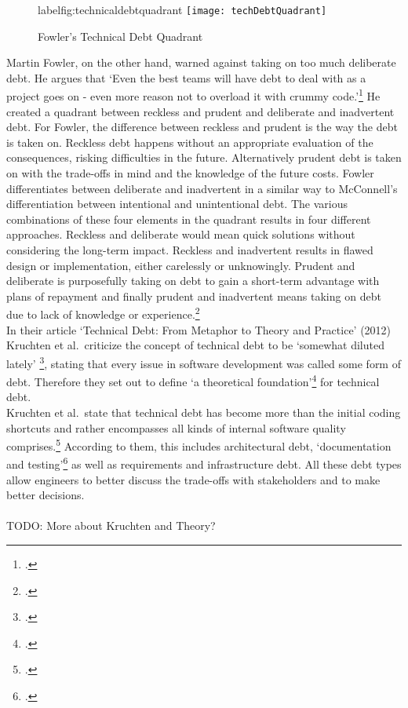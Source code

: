 \begin{figure}[H]
    \centering
    \caption[]{Fowler's Technical Debt Quadrant}
    label{fig:technicaldebtquadrant}
    \texttt{[image: techDebtQuadrant]}
\end{figure}
Martin Fowler, on the other hand, warned against taking on too much deliberate debt. He argues that `Even the best teams will have debt to deal with as a project goes on - even more reason not to overload it with crummy code.'\footcite{fowlerTechnicalDebtQuadrant2009}
He created a quadrant between reckless and prudent and deliberate and inadvertent debt. For Fowler, the difference between reckless and prudent is the way the debt is taken on. Reckless debt happens without an appropriate evaluation of the consequences, risking difficulties in the future. Alternatively prudent debt is taken on
with the trade-offs in mind and the knowledge of the future costs. Fowler differentiates between deliberate and inadvertent in a similar way to McConnell's differentiation between intentional and unintentional debt.
The various combinations of these four elements in the quadrant results in four different approaches. Reckless and deliberate would mean quick solutions without considering the long-term impact. Reckless and inadvertent results in flawed design or implementation, either carelessly or unknowingly. 
Prudent and deliberate is purposefully taking on debt to gain a short-term advantage with plans of repayment and finally prudent and inadvertent means taking on debt due to lack of knowledge or experience.\footcite{fowlerTechnicalDebtQuadrant2009}\\

In their article `Technical Debt: From Metaphor to Theory and Practice' (2012) Kruchten et al.\ criticize the concept of technical debt to be `somewhat diluted lately' \footcite[18]{kruchtenTechnicalDebtMetaphor2012}, stating that every issue in software development was called some form of debt. 
Therefore they set out to define `a theoretical foundation'\footcite[19]{kruchtenTechnicalDebtMetaphor2012} for technical debt.\\
Kruchten et al.\ state that technical debt has become more than the initial coding shortcuts and rather encompasses all kinds of internal software quality comprises.\footcite[19]{kruchtenTechnicalDebtMetaphor2012}
According to them, this includes architectural debt, `documentation and testing'\footcite[20]{kruchtenTechnicalDebtMetaphor2012} as well as requirements and infrastructure debt.
All these debt types allow engineers to better discuss the trade-offs with stakeholders and to make better decisions.\\
\\TODO: More about Kruchten and Theory?

